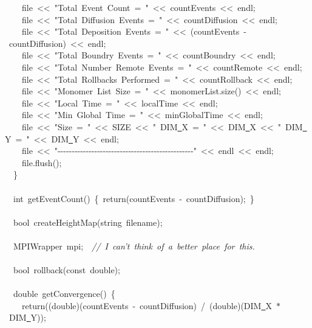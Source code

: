 {\ \ \ \ file\ <{}<{}\ "{}Total\ Event\ Count\ =\ "{}\ <{}<{}\ countEvents\ <{}<{}\ endl;\\
\ \ \ \ file\ <{}<{}\ "{}Total\ Diffusion\ Events\ =\ "{}\ <{}<{}\ countDiffusion\ <{}<{}\ endl;\\
\ \ \ \ file\ <{}<{}\ "{}Total\ Deposition\ Events\ =\ "{}\ <{}<{}\ (countEvents\ -{}\ countDiffusion)\ <{}<{}\ endl;\\
\ \ \ \ file\ <{}<{}\ "{}Total\ Boundry\ Events\ =\ "{}\ <{}<{}\ countBoundry\ <{}<{}\ endl;\\
\ \ \ \ file\ <{}<{}\ "{}Total\ Number\ Remote\ Events\ =\ "{}\ <{}<{}\ countRemote\ <{}<{}\ endl;\\
\ \ \ \ file\ <{}<{}\ "{}Total\ Rollbacks\ Performed\ =\ "{}\ <{}<{}\ countRollback\ <{}<{}\ endl;\\
\ \ \ \ file\ <{}<{}\ "{}Monomer\ List\ Size\ =\ "{}\ <{}<{}\ monomerList.size()\ <{}<{}\ endl;\\
\ \ \ \ file\ <{}<{}\ "{}Local\ Time\ =\ "{}\ <{}<{}\ localTime\ <{}<{}\ endl;\\
\ \ \ \ file\ <{}<{}\ "{}Min\ Global\ Time\ =\ "{}\ <{}<{}\ minGlobalTime\ <{}<{}\ endl;\\
\ \ \ \ file\ <{}<{}\ "{}Size\ =\ "{}\ <{}<{}\ SIZE\ <{}<{}\ "{}\ DIM\underline\ X\ =\ "{}\ <{}<{}\ DIM\underline\ X\ <{}<{}\ "{}\ DIM\underline\ Y\ =\ "{}\ <{}<{}\ DIM\underline\ Y\ <{}<{}\ endl;\\
\ \ \ \ file\ <{}<{}\ "{}-{}-{}-{}-{}-{}-{}-{}-{}-{}-{}-{}-{}-{}-{}-{}-{}-{}-{}-{}-{}-{}-{}-{}-{}-{}-{}-{}-{}-{}-{}-{}-{}-{}-{}-{}-{}-{}-{}-{}-{}-{}-{}-{}-{}-{}-{}-{}-{}"{}\ <{}<{}\ endl\ <{}<{}\ endl;\\
\ \ \ \ file.flush();\\
\ \ \}\\
\ \\
\ \ int\ getEventCount()\ \{\ return(countEvents\ -{}\ countDiffusion);\ \}\\
\ \\
\ \ bool\ createHeightMap(string\ filename);\\
\ \\
\ \ MPIWrapper\ mpi;\ \ \textsl{//\ I\ can't\ think\ of\ a\ better\ place\ for\ this.}\\
\ \\
\ \ bool\ rollback(const\ double);\\
\ \\
\ \ double\ getConvergence()\ \{\\
\ \ \ \ return((double)(countEvents\ -{}\ countDiffusion)\ /\ (double)(DIM\underline\ X\ $\ast$\ DIM\underline\ Y));\\
}
